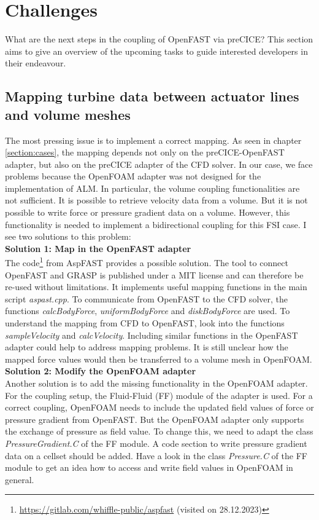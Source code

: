 \section{Challenges}
\label{section:challenges}

What are the next steps in the coupling of OpenFAST via preCICE? This section aims to give an overview of the upcoming tasks to guide interested developers in their endeavour. 

\subsection{Mapping turbine data between actuator lines and volume meshes}

The most pressing issue is to implement a correct mapping. As seen in chapter \ref{section:cases}, the mapping depends not only on the preCICE-OpenFAST adapter, but also on the preCICE adapter of the CFD solver. In our case, we face problems because the OpenFOAM adapter was not designed for the implementation of ALM. In particular, the volume coupling functionalities are not sufficient. It is possible to retrieve velocity data from a volume. But it is not possible to write force or pressure gradient data on a volume. However, this functionality is needed to implement a bidirectional coupling for this FSI case. I see two solutions to this problem:\\
\textbf{Solution 1: Map in the OpenFAST adapter}\\
The code\footnote{\url{https://gitlab.com/whiffle-public/aspfast} (visited on 28.12.2023)} from AspFAST provides a possible solution. The tool to connect OpenFAST and GRASP is published under a MIT license and can therefore be re-used without limitations. It implements useful mapping functions in the main script \textit{aspast.cpp}. To communicate from OpenFAST to the CFD solver, the functions \textit{calcBodyForce}, \textit{uniformBodyForce} and \textit{diskBodyForce} are used. To understand the mapping from CFD to OpenFAST, look into the functions \textit{sampleVelocity} and \textit{calcVelocity}. Including similar functions in the OpenFAST adapter could help to address mapping problems. It is still unclear how the mapped force values would then be transferred to a volume mesh in OpenFOAM.\\[12pt]
\textbf{Solution 2: Modify the OpenFOAM adapter}\\
Another solution is to add the missing functionality in the OpenFOAM adapter. For the coupling setup, the Fluid-Fluid (FF) module of the adapter is used. For a correct coupling, OpenFOAM needs to include the updated field values of force or pressure gradient from OpenFAST. But the OpenFOAM adapter only supports the exchange of pressure as field value. To change this, we need to adapt the class \textit{PressureGradient.C} of the FF module. A code section to write pressure gradient data on a cellset should be added. Have a look in the class \textit{Pressure.C} of the FF module to get an idea how to access and write field values in OpenFOAM in general.

